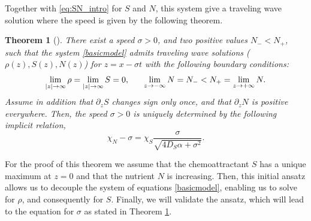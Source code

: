\documentclass[11pt,twoside]{article}
\numberwithin{equation}{section}
\DeclareMathOperator{\sign}{sign}
\theoremstyle{plain}
\newtheorem{theorem}{Theorem}[section]
\theoremstyle{nonumberplain}
\begin{document}
{Together with \eqref{eq:SN_intro} for $S$ and $N$, this system give a traveling wave solution where the speed is given by the following theorem.

\begin{theorem}[\cite{calvez2019chemotactic}]\label{thmacro}
There exist a speed $\sigma>0$, and two positive values $N_- < N_+$, such that the system \eqref{basicmodel} admits traveling wave solutions ($\rho (z), S(z), N(z)$) for $z=x - \sigma t$ with the following boundary conditions:
\begin{equation}
    \lim_{|z| \to \infty} \rho = \lim_{|z| \to \infty} S = 0, \hspace{0.6cm} \lim_{z \to -\infty} N = N_- < N_+ = \lim_{z \to + \infty} N.
    \nonumber
\end{equation}
Assume in addition that $\partial_z S$ changes sign only once, and that $\partial_z N$ is positive everywhere. Then, the speed $\sigma > 0$ is uniquely determined by the following implicit relation,
\[
\chi_N - \sigma = \chi_S \frac{\sigma}{\sqrt{4 D_S \alpha + \sigma^2}}.
\]
\end{theorem}

For the proof of this theorem we assume that the chemoattractant $S$ has a unique maximum at $z = 0$ and that the nutrient $N$ is increasing. Then, this initial ansatz allows us to decouple the system of equations \eqref{basicmodel}, enabling us to solve for $\rho$, and consequently for $S$. Finally, we will validate the ansatz, which will lead to the equation for $\sigma$ as stated in Theorem \ref{thmacro}.

}
\end{document}
